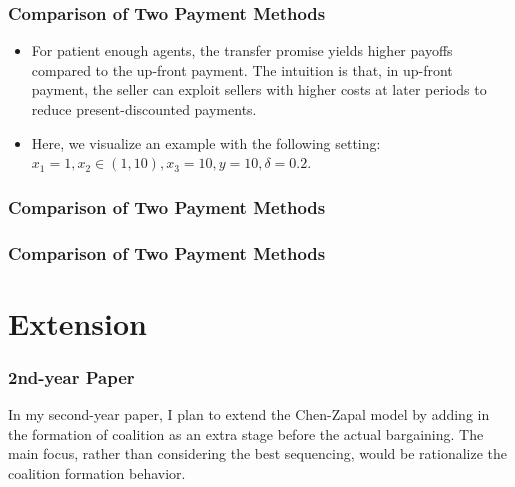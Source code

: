 \documentclass[pdflatex]{beamer}
\providecommand{\texnameMaster}{ProjectGAZ}%
\begin{document}
\begin{frame}
	\frametitle{Comparison of Two Payment Methods}
	\begin{itemize}
		\item For patient enough agents, the transfer promise yields higher payoffs compared to the up-front payment. The intuition is that, in up-front payment, the seller can exploit sellers with higher costs at later periods to reduce present-discounted payments.
		\item Here, we visualize an example with the following setting: $x_1 = 1, x_2 \in (1, 10), x_3 = 10, y = 10, \delta = 0.2$.
	\end{itemize}
	
\end{frame}

\begin{frame}[shrink = 5]
	\frametitle{Comparison of Two Payment Methods}	
		
\end{frame}

\begin{frame}[shrink = 5]
	\frametitle{Comparison of Two Payment Methods}
	
\end{frame}

\section{Extension}
\begin{frame}
	\frametitle{2nd-year Paper}
	In my second-year paper, I plan to extend the Chen-Zapal model by adding in the formation of coalition as an extra stage before the actual bargaining.
	The main focus, rather than considering the best sequencing, would be rationalize the coalition formation behavior. 
\end{frame}


\def\newblock{\hskip .11em plus .33em minus .07em}

\begin{frame}

\renewcommand{\bibsection}{\subsubsection*{\bibname }}

\tiny 



\end{frame}
\end{document}
